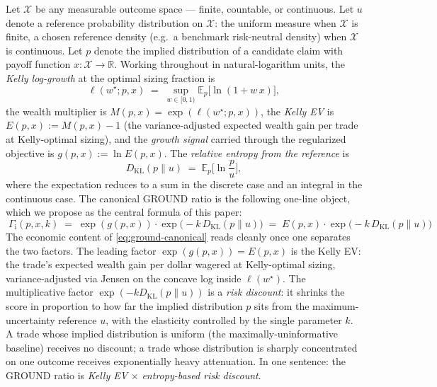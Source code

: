 \documentclass[11pt]{article}
\theoremstyle{definition}
\theoremstyle{remark}
\newcommand{\E}{\mathbb{E}}
\newcommand{\R}{\mathbb{R}}
\newcommand{\G}{g}
\newcommand{\X}{\mathcal{X}}
\newcommand{\KL}{D_{\mathrm{KL}}}
\newcommand{\GROUND}{\Gamma_{\mathrm{i}}}
\begin{document}
Let $\X$ be any measurable outcome space --- finite, countable, or
continuous. Let $u$ denote a reference probability distribution on
$\X$: the uniform measure when $\X$ is finite, a chosen reference
density (e.g.\ a benchmark risk-neutral density) when $\X$ is
continuous. Let $p$ denote the implied distribution of a candidate
claim with payoff function $x: \X \to \R$. Working throughout in
natural-logarithm units, the \emph{Kelly log-growth} at the
optimal sizing fraction is
\begin{equation}
\ell(w^\star; p, x) \;=\; \sup_{w \in [0, 1)} \E_p\!\bigl[\ln(1 + w \, x)\bigr],
\label{eq:ell-canonical}
\end{equation}
the wealth multiplier is $M(p, x) = \exp(\ell(w^\star; p, x))$, the
\emph{Kelly EV} is $E(p, x) := M(p, x) - 1$ (the variance-adjusted
expected wealth gain per trade at Kelly-optimal sizing), and the
\emph{growth signal} carried through the regularized objective is
$\G(p, x) := \ln E(p, x)$. The \emph{relative entropy from the
reference} is
\begin{equation}
\KL(p \| u) \;=\; \E_p\!\biggl[\ln \frac{p}{u}\biggr],
\label{eq:KL-canonical}
\end{equation}
where the expectation reduces to a sum in the discrete case and an
integral in the continuous case. The canonical GROUND ratio is the
following one-line object, which we propose as the central formula
of this paper:
\begin{equation}
\boxed{\;
\GROUND(p, x, k) \;=\; \exp(\G(p, x)) \cdot \exp\!\bigl( -k \, \KL(p \| u) \bigr)
\;=\; E(p, x) \cdot \exp\!\bigl( -k \, \KL(p \| u) \bigr)
\;}
\label{eq:ground-canonical}
\end{equation}
The economic content of \eqref{eq:ground-canonical} reads cleanly
once one separates the two factors. The leading factor
$\exp(\G(p,x)) = E(p, x)$ is the Kelly EV: the trade's expected wealth
gain per dollar wagered at Kelly-optimal sizing, variance-adjusted via
Jensen on the concave log inside $\ell(w^\star)$. The multiplicative factor
$\exp(-k \KL(p \| u))$ is a \emph{risk discount}: it shrinks the score
in proportion to how far the implied distribution $p$ sits from the
maximum-uncertainty reference $u$, with the elasticity controlled by
the single parameter $k$. A trade whose implied distribution is
uniform (the maximally-uninformative baseline) receives no discount; a
trade whose distribution is sharply concentrated on one outcome
receives exponentially heavy attenuation. In one sentence: the GROUND
ratio is \emph{Kelly EV} $\times$ \emph{entropy-based risk discount}.
\end{document}
